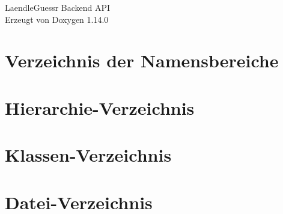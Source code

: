\documentclass[twoside]{book}
\newcommand{\+}{\discretionary{\mbox{\scriptsize$\hookleftarrow$}}{}{}}
\newcommand{\clearemptydoublepage}{%
    \newpage{\pagestyle{empty}\cleardoublepage}%
  }
\begin{document}
  \raggedbottom
    \hypersetup{pageanchor=false,
                bookmarksnumbered=true,
                pdfencoding=unicode
               }
  \begin{titlepage}
  \vspace*{7cm}
  \begin{center}%
  {\Large Laendle\+Guessr Backend API}\\
  \vspace*{1cm}
  {\large Erzeugt von Doxygen 1.14.0}\\
  \end{center}
  \end{titlepage}
  \clearemptydoublepage
  \tableofcontents
  \clearemptydoublepage
  \hypersetup{pageanchor=true}
\chapter{Verzeichnis der Namensbereiche}

\chapter{Hierarchie-\/\+Verzeichnis}

\chapter{Klassen-\/\+Verzeichnis}

\chapter{Datei-\/\+Verzeichnis}

\end{document}

